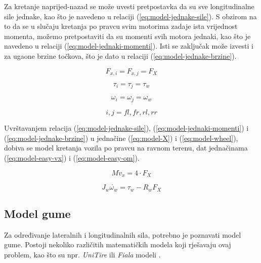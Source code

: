 Za kretanje naprijed-nazad se može uvesti pretpostavka da su sve longitudinalne sile jednake, kao što je navedeno u relaciji (\ref{eq:model-jednake-sile}). S obzirom na to da se u slučaju kretanja po pravcu svim motorima zadaje ista vrijednost momenta, možemo pretpostaviti da su momenti svih motora jednaki, kao što je navedeno u relaciji (\ref{eq:model-jednaki-momenti}). Isti se zaključak može izvesti i za ugaone brzine točkova, što je dato u relaciji (\ref{eq:model-jednake-brzine}).

\begin{equation}\label{eq:model-jednake-sile}
F_{x,i}=F_{x,j}=F_X
\end{equation}

\begin{equation}\label{eq:model-jednaki-momenti}
\tau_i=\tau_j=\tau_w
\end{equation}

\begin{equation}\label{eq:model-jednake-brzine}
\omega_i=\omega_j=\omega_w
\end{equation}

\begin{equation*}
i,j = fl, fr, rl, rr
\end{equation*}

Uvrštavanjem relacija (\ref{eq:model-jednake-sile}), (\ref{eq:model-jednaki-momenti}) i (\ref{eq:model-jednake-brzine}) u jednačine (\ref{eq:model-X}) i (\ref{eq:model-wheel}), dobiva se model kretanja vozila po pravcu na ravnom terenu, dat jednačinama (\ref{eq:model-easy-vx}) i (\ref{eq:model-easy-om}).

\begin{equation}\label{eq:model-easy-vx}
M \dot{v}_x = 4 \cdot F_X
\end{equation}

\begin{equation}\label{eq:model-easy-om}
J_w \dot{\omega_w} = \tau_w - R_w F_X
\end{equation}

\subsection{Model gume}

\qquad Za određivanje lateralnih i longitudinalnih sila, potrebno je poznavati model gume. Postoji nekoliko različitih matematičkih modela koji rješavaju ovaj problem, kao što su npr. \textit{UniTire} ili \textit{Fiala} modeli \citep{ma2017design}.

